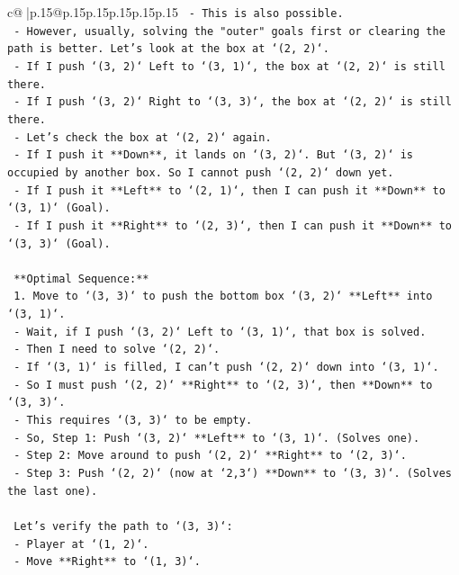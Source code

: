 \documentclass{article}
\begin{document}
{\begin{supertabular}{c@{$\;$}|p{.15\linewidth}@{}p{.15\linewidth}p{.15\linewidth}p{.15\linewidth}p{.15\linewidth}p{.15\linewidth}}
{{{\texttt{    {-}   This is also possible.} \\
\texttt{    {-}   However, usually, solving the "outer" goals first or clearing the path is better. Let's look at the box at `(2, 2)`.} \\
\texttt{    {-}   If I push `(3, 2)` Left to `(3, 1)`, the box at `(2, 2)` is still there.} \\
\texttt{    {-}   If I push `(3, 2)` Right to `(3, 3)`, the box at `(2, 2)` is still there.} \\
\texttt{    {-}   Let's check the box at `(2, 2)` again.} \\
\texttt{        {-}   If I push it **Down**, it lands on `(3, 2)`. But `(3, 2)` is occupied by another box. So I cannot push `(2, 2)` down yet.} \\
\texttt{        {-}   If I push it **Left** to `(2, 1)`, then I can push it **Down** to `(3, 1)` (Goal).} \\
\texttt{        {-}   If I push it **Right** to `(2, 3)`, then I can push it **Down** to `(3, 3)` (Goal).} \\
\\ 
\texttt{    **Optimal Sequence:**} \\
\texttt{    1.  Move to `(3, 3)` to push the bottom box `(3, 2)` **Left** into `(3, 1)`.} \\
\texttt{        {-}   Wait, if I push `(3, 2)` Left to `(3, 1)`, that box is solved.} \\
\texttt{        {-}   Then I need to solve `(2, 2)`.} \\
\texttt{        {-}   If `(3, 1)` is filled, I can't push `(2, 2)` down into `(3, 1)`.} \\
\texttt{        {-}   So I must push `(2, 2)` **Right** to `(2, 3)`, then **Down** to `(3, 3)`.} \\
\texttt{        {-}   This requires `(3, 3)` to be empty.} \\
\texttt{        {-}   So, Step 1: Push `(3, 2)` **Left** to `(3, 1)`. (Solves one).} \\
\texttt{        {-}   Step 2: Move around to push `(2, 2)` **Right** to `(2, 3)`.} \\
\texttt{        {-}   Step 3: Push `(2, 2)` (now at `2,3`) **Down** to `(3, 3)`. (Solves the last one).} \\
\\ 
\texttt{    Let's verify the path to `(3, 3)`:} \\
\texttt{    {-}   Player at `(1, 2)`.} \\
\texttt{    {-}   Move **Right** to `(1, 3)`.} \\
}}}
\end{supertabular}}
\end{document}
